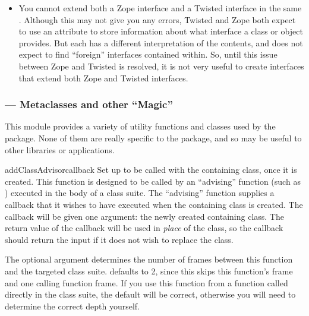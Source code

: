 \begin{verbatim%
}
\begin{verbatim%
}
\begin{verbatim%
}
\begin{verbatim%
}
\begin{verbatim%
}
\begin{verbatim%
}
\begin{itemize}
\item You cannot extend both a Zope interface and a Twisted interface in the
same .  Although this may not give you any errors,
Twisted and Zope both expect to use an  attribute to
store information about what interface a class or object provides.  But each has
a different interpretation of the contents, and does not expect to find
``foreign'' interfaces contained within.  So, until this issue between Zope and
Twisted is resolved, it is not very useful to create interfaces that extend
both Zope and Twisted interfaces.

\end{itemize}


















\newpage
\subsubsection{ --- Metaclasses and other ``Magic''}

This module provides a variety of utility functions and classes used by the
 package.  None of them are really specific to the
 package, and so may be useful to other libraries or
applications.

\begin{funcdesc}{addClassAdvisor}{callback }
Set up  to be called with the containing class, once it is
created.  This function is designed to be called by an ``advising'' function
(such as ) executed in the body of a class suite.
The ``advising'' function supplies a callback that it wishes to have executed
when the containing class is created.  The callback will be given one argument:
the newly created containing class.  The return value of the callback will be
used in \emph{place} of the class, so the callback should return the input if
it does not wish to replace the class.

The optional  argument determines the number of frames between this
function and the targeted class suite.   defaults to 2, since this
skips this function's frame and one calling function frame.  If you use this
function from a function called directly in the class suite, the default will
be correct, otherwise you will need to determine the correct depth yourself.


\end{funcdesc}
\end{verbatim%
}
\end{verbatim%
}
\end{verbatim%
}
\end{verbatim%
}
\end{verbatim%
}
\end{verbatim%
}

